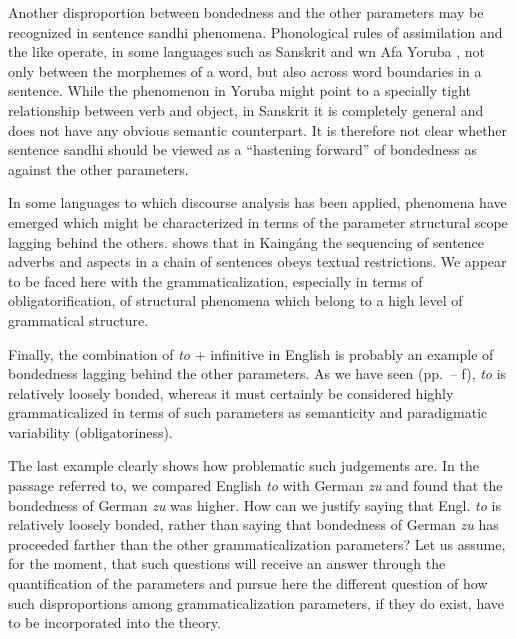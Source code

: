 Another disproportion between bondedness and the other parameters may be recognized in sentence sandhi phenomena. Phonological rules of assimilation and the like operate, in some languages such as Sanskrit and wn Afa Yoruba \citep[26f]{HeineEtAl1984}, not only between the morphemes of a word, but also across word boundaries in a sentence. While the phenomenon in Yoruba might point to a specially tight relationship between verb and object, in Sanskrit it is completely general and does not have any obvious semantic counterpart. It is therefore not clear whether sentence sandhi should be viewed as a “hastening forward” of bondedness as against the other parameters.

In some languages to which discourse analysis has been applied, phenomena have emerged which might be characterized in terms of the parameter structural scope lagging behind the others. \citet{Wiesemann1980} shows that in Kaingáng the sequencing of sentence adverbs and aspects in a chain of sentences obeys textual restrictions. We appear to be faced here with the grammaticalization, especially in terms of obligatorification, of structural phenomena which belong to a high level of grammatical structure.

Finally, the combination of \textit{to} + infinitive in English is probably an example of bondedness lagging behind the other parameters. As we have seen (pp.~\pageref{page161}--\pageref{page161b}\chk%
f), \textit{to} is relatively loosely bonded, whereas it must certainly be considered highly grammaticalized in terms of such parameters as semanticity and paradigmatic variability (obligatoriness).

The last example clearly shows how problematic such judgements are. In the passage referred to, we compared English \textit{to} with German \textit{zu} and found that the bondedness of German \textit{zu} was higher. How can we justify saying that Engl. \textit{to} is relatively loosely bonded, rather than saying that bondedness of German \textit{zu} has proceeded farther than the other grammaticalization parameters? Let us assume, for the moment, that such questions will receive an answer through the quantification of the parameters and pursue here the different question of how such disproportions among grammaticalization parameters, if they do exist, have to be incorporated into the theory.

